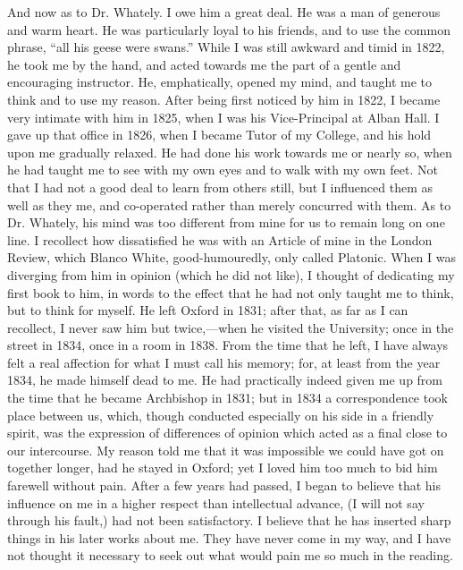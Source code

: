 And now as to Dr. Whately. I owe him a great deal. He was a man of
generous and warm heart. He was particularly loyal to his friends, and
to use the common phrase, ``all his geese were swans.'' While
I was still awkward and timid in 1822, he took me by the hand, and
acted towards me the part of a gentle and encouraging
instructor. He, emphatically, opened my mind, and taught me to think
and to use my reason. After being first noticed by him in 1822, I
became very intimate with him in 1825, when I was his Vice-Principal
at Alban Hall. I gave up that office in 1826, when I became Tutor of
my College, and his hold upon me gradually relaxed. He had done his
work towards me or nearly so, when he had taught me to see with my own
eyes and to walk with my own feet. Not that I had not a good deal to
learn from others still, but I influenced them as well as they me, and
co-operated rather than merely concurred with them. As to Dr. Whately,
his mind was too different from mine for us to remain long on one
line. I recollect how dissatisfied he was with an Article of mine in
the London Review, which Blanco White, good-humouredly, only called
Platonic. When I was diverging from him in opinion (which he
did not like), I thought of dedicating my first book to him, in words
to the effect that he had not only taught me to think, but to think
for myself. He left Oxford in 1831; after that, as far as I can
recollect, I never saw him but twice,—when he visited the
University; once in the street in 1834, once in a room in
1838. From the time that he left, I have always felt a real
affection for what I must call his memory; for, at least from the
year 1834, he made himself dead to me. He had practically indeed
given me up from the time that he became Archbishop in 1831; but in
1834 a correspondence took place between us, which, though conducted
especially on his side in a friendly spirit, was the expression of
differences of opinion which acted as a final close to our
intercourse. My reason told me that it was impossible we
could have got on together longer, had he stayed in Oxford;
yet I loved him too much to bid him farewell without pain. After a few
years had passed, I began to believe that his influence on me in a
higher respect than intellectual advance, (I will not say through his
fault,) had not been satisfactory. I believe that he has inserted
sharp things in his later works about me. They have never come in my
way, and I have not thought it necessary to seek out what would pain
me so much in the reading.

